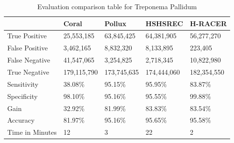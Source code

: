 \documentclass{llncs}
\newcommand{\TBstrut}{{\rule{0pt}{2ex}}{\rule[2ex]{0pt}{0pt}}} %
\begin{document}
\begin{longtable}{|m{33mm}|m{20mm}|m{20mm}|m{20mm}|m{20mm}|}
	    \caption{\label{tab:eval-2}Evaluation comparison table for Treponema Pallidum}\\
        \hline
           & Coral & Pollux & HSHSREC & H-RACER\cellcolor{DarkGray} \TBstrut\\ %
        \hline
           True Positive & 25,553,185 & 63,845,425 & 64,381,905 & 56,277,270\cellcolor{LightGray} \TBstrut\\ %
        \hline
           False Positive & 3,462,165 & 8,832,320 & 8,133,895 & 223,405\cellcolor{LightGray} \TBstrut\\ %
        \hline
           False Negative & 41,547,065 & 3,254,825 & 2,718,345 & 10,822,980\cellcolor{LightGray} \TBstrut\\ %
        \hline
           True Negative & 179,115,790 & 173,745,635 & 174,444,060 & 182,354,550\cellcolor{LightGray} \TBstrut\\ %
        \hline
           Sensitivity & 38.08\% & 95.15\% & 95.95\% & 83.87\%\cellcolor{LightGray} \TBstrut\\ %
        \hline
           Specificity & 98.10\% &  95.16\% & 95.55\% & 99.88\%\cellcolor{LightGray} \TBstrut\\ %
        \hline
           Gain & 32.92\% & 81.99\% & 83.83\% & 83.54\%\cellcolor{LightGray} \TBstrut\\ %
        \hline
           Accuracy & 81.97\% & 95.16\% & 95.65\% & 95.58\%\cellcolor{LightGray} \TBstrut\\ %
        \hline
           Time in Minutes& 12 & 3 & 22 & 2\cellcolor{LightGray} \TBstrut\\ %
        \hline
\end{longtable}
\end{document}
